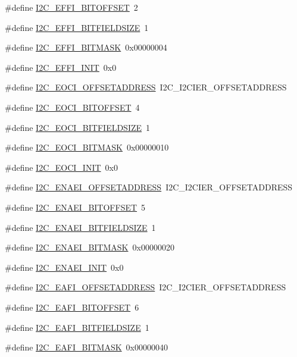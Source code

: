 \begin{DoxyCompactItemize}
\#define \hyperlink{a00558_ae60a6b235b3e7d91c7787ed281d21d46}{I2C\_\-EFFI\_\-BITOFFSET}~2
\item 
\#define \hyperlink{a00558_a4fa3075376bc13ec626373017a05135c}{I2C\_\-EFFI\_\-BITFIELDSIZE}~1
\item 
\#define \hyperlink{a00558_ae0d5a25d624ce240e748e8b4c77d2a16}{I2C\_\-EFFI\_\-BITMASK}~0x00000004
\item 
\#define \hyperlink{a00558_a523d8e245b682ed4619458c9cb382e27}{I2C\_\-EFFI\_\-INIT}~0x0
\item 
\#define \hyperlink{a00558_a11311c70f2bc69a3df2dd2cee9990fc7}{I2C\_\-EOCI\_\-OFFSETADDRESS}~I2C\_\-I2CIER\_\-OFFSETADDRESS
\item 
\#define \hyperlink{a00558_a330c6a378967322aed43829dc329f35a}{I2C\_\-EOCI\_\-BITOFFSET}~4
\item 
\#define \hyperlink{a00558_ab301a0b2dc92a81343fea1e2f8626458}{I2C\_\-EOCI\_\-BITFIELDSIZE}~1
\item 
\#define \hyperlink{a00558_a2d1dd1631dc699869258dd3a2b32e9fd}{I2C\_\-EOCI\_\-BITMASK}~0x00000010
\item 
\#define \hyperlink{a00558_a797028ebef32b67f958100f5e99a3d23}{I2C\_\-EOCI\_\-INIT}~0x0
\item 
\#define \hyperlink{a00558_a8474ae0e4921e167cc86d66b3b7861bb}{I2C\_\-ENAEI\_\-OFFSETADDRESS}~I2C\_\-I2CIER\_\-OFFSETADDRESS
\item 
\#define \hyperlink{a00558_afda4cbe5bbbb98cdc8306a1b61bfdcd8}{I2C\_\-ENAEI\_\-BITOFFSET}~5
\item 
\#define \hyperlink{a00558_a3d55b163359e649ff9ff5f940227727b}{I2C\_\-ENAEI\_\-BITFIELDSIZE}~1
\item 
\#define \hyperlink{a00558_a9fa7ed9a4761a9a6eeabfdfdc6071e4d}{I2C\_\-ENAEI\_\-BITMASK}~0x00000020
\item 
\#define \hyperlink{a00558_a0d4a32de34add75352d9bb49eda6dfc9}{I2C\_\-ENAEI\_\-INIT}~0x0
\item 
\#define \hyperlink{a00558_a3d23db967c6d3739ada21a39d1ff5fac}{I2C\_\-EAFI\_\-OFFSETADDRESS}~I2C\_\-I2CIER\_\-OFFSETADDRESS
\item 
\#define \hyperlink{a00558_a154cf7ce1bf53e2d8830e12f296ed738}{I2C\_\-EAFI\_\-BITOFFSET}~6
\item 
\#define \hyperlink{a00558_aa1feb4f38f53a6368e830ce20d696fa7}{I2C\_\-EAFI\_\-BITFIELDSIZE}~1
\item 
\#define \hyperlink{a00558_a5be2e10eb9ee8cc18f300279e139a695}{I2C\_\-EAFI\_\-BITMASK}~0x00000040
\item 

\end{DoxyCompactItemize}
